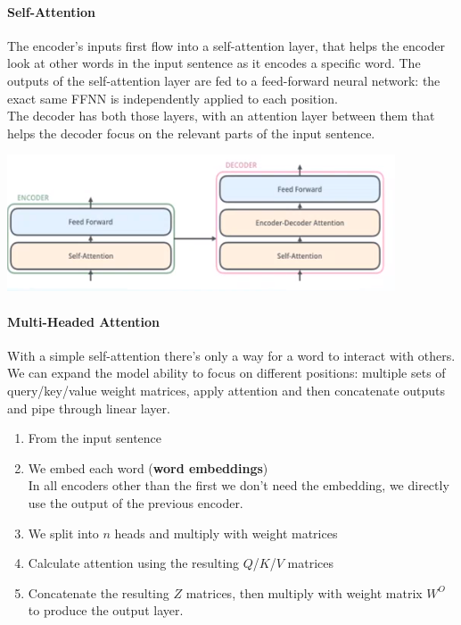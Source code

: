 \documentclass[10pt]{report}
\begin{document}
\paragraph{Self-Attention} The encoder's inputs first flow into a self-attention layer, that helps the encoder look at other words in the input sentence as it encodes a specific word. The outputs of the self-attention layer are fed to a feed-forward neural network: the exact same FFNN is independently applied to each position.\\
The decoder has both those layers, with an attention layer between them that helps the decoder focus on the relevant parts of the input sentence.
\begin{center}
	\includegraphics[scale=1]{72.png}
\end{center}
\paragraph{Multi-Headed Attention} With a simple self-attention there's only a way for a word to interact with others. We can expand the model ability to focus on different positions: multiple sets of query/key/value weight matrices, apply attention and then concatenate outputs and pipe through linear layer.
\begin{enumerate}
	\item From the input sentence
	\item We embed each word (\textbf{word embeddings})\\
	In all encoders other than the first we don't need the embedding, we directly use the output of the previous encoder.
	\item We split into $n$ heads and multiply with weight matrices
	\item Calculate attention using the resulting $Q$/$K$/$V$ matrices
	\item Concatenate the resulting $Z$ matrices, then multiply with weight matrix $W^O$ to produce the output layer.
\end{enumerate}
\end{document}
